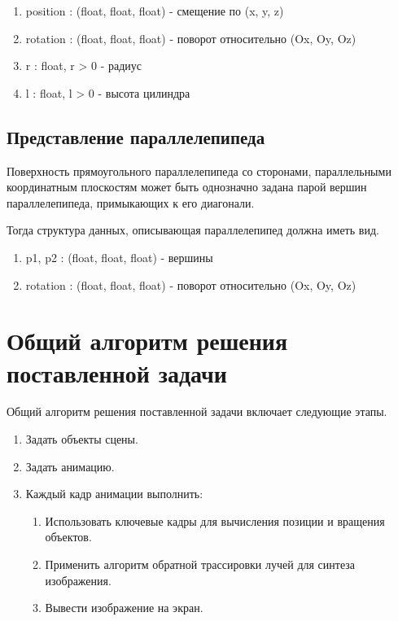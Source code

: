 \begin{enumerate}
	\item position : (float, float, float) - смещение по (x, y, z)
	\item rotation : (float, float, float) - поворот относительно (Ox, Oy, Oz)
	\item r : float, r > 0 - радиус
	\item l : float, l > 0 - высота цилиндра
\end{enumerate}

\subsection*{Представление параллелепипеда}

Поверхность прямоугольного параллелепипеда со сторонами, параллельными координатным плоскостям может быть однозначно задана парой вершин параллелепипеда, примыкающих к его диагонали. 

Тогда структура данных, описывающая параллелепипед должна иметь вид.

\begin{enumerate}
	\item p1, p2 : (float, float, float) - вершины
	\item rotation : (float, float, float) - поворот относительно (Ox, Oy, Oz)
\end{enumerate}

\section{Общий алгоритм решения поставленной задачи}

Общий алгоритм решения поставленной задачи включает следующие этапы.

\begin{enumerate}

\item Задать объекты сцены.
\item Задать анимацию.
\item Каждый кадр анимации выполнить:
	\begin{enumerate}
	\item Использовать ключевые кадры для вычисления позиции и вращения объектов.
	\item Применить алгоритм обратной трассировки лучей для синтеза изображения.
	\item Вывести изображение на экран.
	\end{enumerate}

\end{enumerate}

